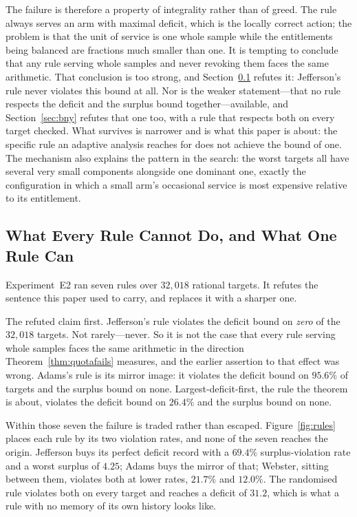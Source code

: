 The failure is therefore a property of integrality rather than of greed. The rule always serves
an arm with maximal deficit, which is the locally correct action; the problem is that the unit
of service is one whole sample while the entitlements being balanced are fractions much smaller
than one. It is tempting to conclude that any rule serving whole samples and never revoking
them faces the same arithmetic. That conclusion is too strong, and
Section~\ref{sec:e2results} refutes it: Jefferson's rule never violates this bound at all.
Nor is the weaker statement---that no rule respects the deficit and the surplus bound
together---available, and Section~\ref{sec:bny} refutes that one too, with a rule that
respects both on every target checked. What survives is narrower and is what this paper is
about: the specific rule an adaptive analysis reaches for does not achieve the bound of one.
The mechanism also explains
the pattern in the search: the worst targets all have several very small components alongside
one dominant one, exactly the configuration in which a small arm's occasional service is most
expensive relative to its entitlement.

\subsection{What Every Rule Cannot Do, and What One Rule Can}
\label{sec:e2results}

Experiment~E2 ran seven rules over $32{,}018$ rational targets. It refutes the sentence this
paper used to carry, and replaces it with a sharper one.

The refuted claim first. Jefferson's rule violates the deficit bound on \emph{zero} of the
$32{,}018$ targets. Not rarely---never. So it is not the case that every rule serving whole
samples faces the same arithmetic in the direction Theorem~\ref{thm:quotafails} measures, and
the earlier assertion to that effect was wrong. Adams's rule is its mirror image: it violates
the deficit bound on $95.6\%$ of targets and the surplus bound on none. Largest-deficit-first,
the rule the theorem is about, violates the deficit bound on $26.4\%$ and the surplus bound on
none. \NUM{}

Within those seven the failure is traded rather than escaped. Figure~\ref{fig:rules} places
each rule by its two violation rates, and none of the seven reaches the origin. Jefferson buys
its perfect deficit record with a $69.4\%$ surplus-violation rate and a worst surplus of
$4.25$; Adams buys the mirror of that; Webster, sitting between them, violates both at lower
rates, $21.7\%$ and $12.0\%$. The randomised rule violates both on every target and reaches a
deficit of $31.2$, which is what a rule with no memory of its own history looks like.


